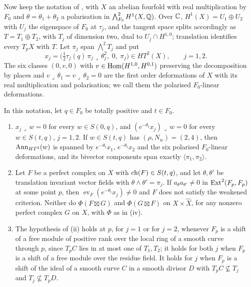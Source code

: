 Now keep the notation of , with $X$ an abelian
fourfold with real multiplication by $F_{0}$ and $\theta=\theta_{1}+\theta_{2}$
a polarisation in $\bigwedge^{2}_{F_{0}}H^{1}(X,\mathbb{Q})$. Over $\mathbb{C}$,
$H^{1}(X)=U_{1}\oplus U_{2}$ with $U_{j}$ the eigenspace of $F_{0}$ at
$\tau_{j}$, and the tangent space splits accordingly as $T=T_{1}\oplus T_{2}$,
with $T_{j}$ of dimension two, dual to $U_{j}\cap H^{1,0}$; translation
identifies every $T_{p}X$ with $T$. Let $\pi_{j}$ span $\bigwedge^{2}T_{j}$
and put
\begin{equation}\label{eq:quarticcompensated}
  x_{j}=\bigl(\tfrac12\tau_{j}(q)\,\pi_{j}\lrcorner\,\theta_{j}^{2},\;0,\;\pi_{j}\bigr)
  \in HT^{2}(X),\qquad j=1,2.
\end{equation}
The six classes $(0,v,0)$ with $v\in\operatorname{Hom}(H^{1,0},H^{0,1})$ preserving the
decomposition by places and $v\lrcorner\,\theta_{1}=v\lrcorner\,\theta_{2}=0$
are the first order deformations of $X$ with its real multiplication and
polarisation; we call them the polarised $F_{0}$-linear deformations.

\begin{theorem}
\label{thm:quarticlocal}
In this notation, let $q\in F_{0}$ be totally positive and $t\in F_{0}$.
\begin{enumerate}[label=\textup{(\roman*)},leftmargin=2.6em,itemsep=2pt]
\item $x_{j}\lrcorner\,w=0$ for every $w\in S(0,q)$, and
  $(e^{-\theta_{t}}x_{j})\lrcorner\,w=0$ for every $w\in S(t,q)$, $j=1,2$. If
  $w\in S(t,q)$ has $(\rho,N_{w})=(2,4)$, then $\operatorname{Ann}_{HT^{2}}(w)$ is spanned
  by $e^{-\theta_{t}}x_{1}$, $e^{-\theta_{t}}x_{2}$ and the six polarised
  $F_{0}$-linear deformations, and its bivector components span exactly
  $\langle\pi_{1},\pi_{2}\rangle$.
\item Let $F$ be a perfect complex on $X$ with $\operatorname{ch}(F)\in S(t,q)$, and let
  $\theta,\theta'$ be translation invariant vector fields with
  $\theta\wedge\theta'=\pi_{j}$. If $a_{\theta}a_{\theta'}\ne0$ in
  $\operatorname{Ext}^{2}(F_{p},F_{p})$ at some point $p$, then
  $\operatorname{ev}_{F}(e^{-\theta_{t}}x_{j})\ne0$ and $F$ does not satisfy the
  weakened criterion. Neither do $\Phi(F\boxtimes G)$ and $\Phi(G\boxtimes F)$
  on $X\times\widehat X$, for any nonzero perfect complex $G$ on $X$, with
  $\Phi$ as in (iv).
\item The hypothesis of \textup{(ii)} holds at $p$, for $j=1$ or for $j=2$,
  whenever $F_{p}$ is a shift of a free module of positive rank over the
  local ring of a smooth curve through $p$, since $T_{p}C$ lies in at most one
  of $T_{1},T_{2}$; it holds for both $j$ when $F_{p}$ is a shift of a free
  module over the residue field. It holds for $j$ when $F_{p}$ is a shift of
  the ideal of a smooth curve $C$ in a smooth divisor $D$ with
  $T_{p}C\not\subseteq T_{j}$ and $T_{j}\not\subseteq T_{p}D$.
\end{enumerate}
\end{theorem}

